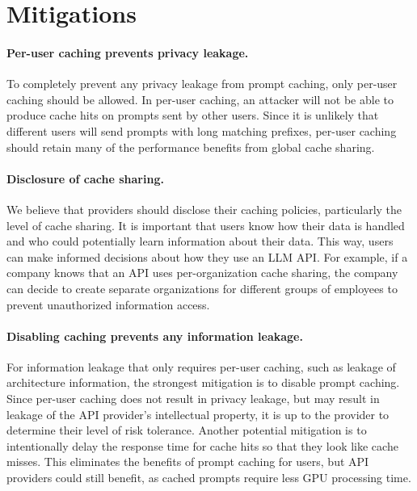 \section{Mitigations}

\paragraph{Per-user caching prevents privacy leakage.} To completely prevent any privacy leakage from prompt caching, only per-user caching should be allowed. In per-user caching, an attacker will not be able to produce cache hits on prompts sent by other users. Since it is unlikely that different users will send prompts with long matching prefixes, per-user caching should retain many of the performance benefits from global cache sharing.

\paragraph{Disclosure of cache sharing.} We believe that providers should disclose their caching policies, particularly the level of cache sharing. It is important that users know how their data is handled and who could potentially learn information about their data. This way, users can make informed decisions about how they use an LLM API. For example, if a company knows that an API uses per-organization cache sharing, the company can decide to create separate organizations for different groups of employees to prevent unauthorized information access.



\paragraph{Disabling caching prevents any information leakage.} For information leakage that only requires per-user caching, such as leakage of architecture information, the strongest mitigation is to disable prompt caching. Since per-user caching does not result in privacy leakage, but may result in leakage of the API provider's intellectual property, it is up to the provider to determine their level of risk tolerance. Another potential mitigation is to intentionally delay the response time for cache hits so that they look like cache misses. This eliminates the benefits of prompt caching for users, but API providers could still benefit, as cached prompts require less GPU processing time. 

